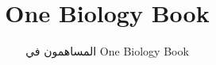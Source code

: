 \documentclass[11pt,a4paper,twoside,openany]{book}
\title{One Biology Book}
\author{المساهمون في One Biology Book}
\date{\bookdate}
\begin{document}
\frontmatter




\tableofcontents

\mainmatter





\appendix
\part{\omsolutionspart}




\backmatter
\renewcommand{\indexspace}{\par\vskip 8pt plus 4pt minus 4pt\relax}
\printindex
\end{document}
